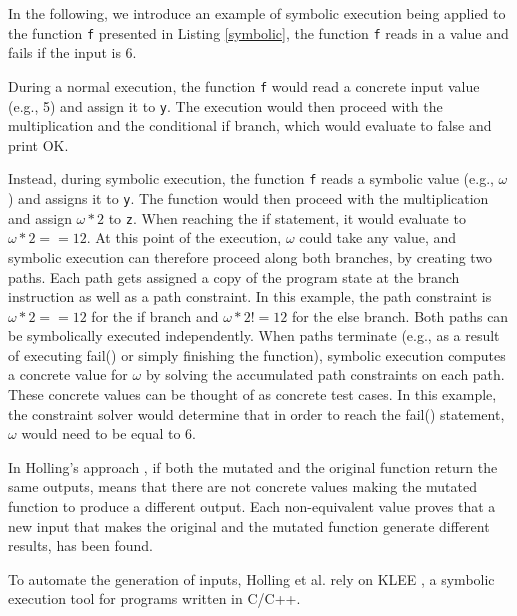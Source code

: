 In the following, we introduce an example of symbolic execution being applied to the function \texttt{f} presented in Listing \ref{symbolic}, the function \texttt{f} reads in a value and fails if the input is 6.



During a normal execution, the function \texttt{f} would read a concrete input value (e.g., 5) and assign it to \texttt{y}. The execution would then proceed with the multiplication and the conditional if branch, which would evaluate to false and print OK.

Instead, during symbolic execution, the function \texttt{f} reads a symbolic value (e.g., $\omega$) and assigns it to \texttt{y}. The function would then proceed with the multiplication and assign $\omega * 2$ to \texttt{z}. When reaching the if statement, it would evaluate to $\omega * 2 == 12$. 
At this point of the execution, $\omega$ could take any value, and symbolic execution can therefore proceed along both branches, by creating two paths. 
Each path gets assigned a copy of the program state at the branch instruction as well as a path constraint. 
In this example, the path constraint is $\omega * 2 == 12$ for the if branch and $\omega * 2 != 12$ for the else branch. 
Both paths can be symbolically executed independently. When paths terminate (e.g., as a result of executing fail() or simply finishing the function), symbolic execution computes a concrete value for $\omega$ by solving the accumulated path constraints on each path. 
These concrete values can be thought of as concrete test cases. In this example, the constraint solver would determine that in order to reach the fail() statement, $\omega$ would need to be equal to 6.

In Holling's approach \cite{holling2016nequivack}, if both the mutated and the original function return the same outputs, means that there are not concrete values making the mutated function to produce a different output.
Each non-equivalent value proves that a new input that makes the original and the mutated function generate different results, has been found. 

To automate the generation of inputs, Holling et al. \cite{holling2016nequivack} rely on KLEE \cite{cadar2008klee}, a symbolic execution tool for programs written in C/C++.

